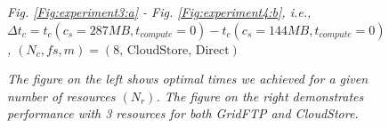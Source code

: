 \documentclass{rspublic}
\begin{document}
\begin{center}
\begin{figure}
{\label{Fig:CloudStore287minus144:c}
}
\caption{\textit{Fig. \ref{Fig:experiment3:a} - Fig. \ref{Fig:experiment4:b}, i.e., $\Delta t_c = t_c(c_s=287 MB, t_{compute}=0) - t_c(c_s=144 MB, t_{compute}=0)$, $(N_c, fs, m) = (\mbox{8, CloudStore, Direct})$}}
\label{Fig:CloudStore287minus144}
\end{figure}
\end{center}

\begin{center}
\begin{figure}
\caption{\textit{The figure on the left shows optimal times we achieved
for a given number of resources $(N_{r})$. The figure on the right
demonstrates performance with 3 resources for both GridFTP and
CloudStore.}}
\label{Fig:CloudStoreVsGridFTP}
\end{figure}
\end{center}
\end{document}
